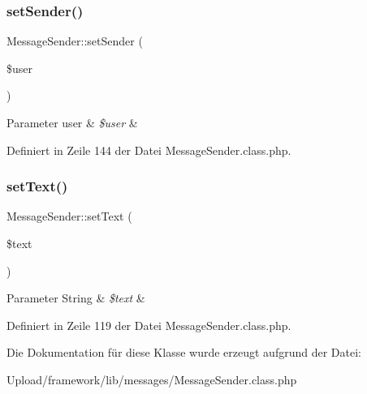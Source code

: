 \subsubsection{\texorpdfstring{set\+Sender()}{setSender()}}
{\footnotesize\ttfamily Message\+Sender\+::set\+Sender (\begin{DoxyParamCaption}\item[{}]{\$user }\end{DoxyParamCaption})}


\begin{DoxyParams}[1]{Parameter}
user & {\em \$user} & \\
\hline
\end{DoxyParams}


Definiert in Zeile 144 der Datei Message\+Sender.\+class.\+php.

\mbox{\label{class_message_sender_aa60a0f3ce0726af9c1d4b172eb54a1e3}} 
\subsubsection{\texorpdfstring{set\+Text()}{setText()}}
{\footnotesize\ttfamily Message\+Sender\+::set\+Text (\begin{DoxyParamCaption}\item[{}]{\$text }\end{DoxyParamCaption})}


\begin{DoxyParams}[1]{Parameter}
String & {\em \$text} & \\
\hline
\end{DoxyParams}


Definiert in Zeile 119 der Datei Message\+Sender.\+class.\+php.



Die Dokumentation für diese Klasse wurde erzeugt aufgrund der Datei\+:\begin{DoxyCompactItemize}
\item 
Upload/framework/lib/messages/Message\+Sender.\+class.\+php\end{DoxyCompactItemize}
